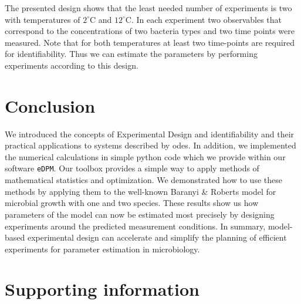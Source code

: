 \documentclass[10pt,A4paper]{article}
\begin{document}
%
The presented design shows that the least needed number of experiments is two with temperatures of $2^\circ$C and $12^\circ$C.
In each experiment two observables that correspond to the concentrations of two bacteria types and two time points were measured.
Note that for both temperatures at least two time-points are required for identifiability.
Thus we can estimate the parameters by performing experiments according to this design.
%
%
%
\section*{Conclusion}
We introduced the concepts of Experimental Design and identifiability and their practical applications to systems described by \acp{ode}.
In addition, we implemented the numerical calculations in simple python code which we provide within our software \texttt{eDPM}.
Our toolbox provides a simple way to apply methods of mathematical statistics and optimization.
We demonstrated how to use these methods by applying them to the well-known Baranyi \& Roberts model for microbial growth with one and two species.
These results show us how parameters of the model can now be estimated most precisely by designing experiments around the predicted measurement conditions.
In summary, model-based experimental design can accelerate and simplify the planning of efficient experiments for parameter estimation in microbiology.
%
%
%
\section*{Supporting information}
%
%
%
\nolinenumbers

\end{document}
